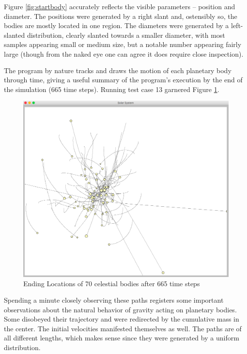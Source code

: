 Figure \ref{fig:startbody} accurately reflects the visible parameters – position and diameter. The positions were generated by a right slant and, ostensibly so, the bodies are mostly located in one region. The diameters were generated by a left-slanted distribution, clearly slanted towards a smaller diameter, with most samples appearing small or medium size, but a notable number appearing fairly large (though from the naked eye one can agree it does require close inspection).

The program by nature tracks and draws the motion of each planetary body through time, giving a useful summary of the program's execution by the end of the simulation (665 time steps). Running test case 13 garnered Figure \ref{fig:endbody}.

\begin{figure}[h!]
\centering
\includegraphics[scale=0.4]{final-ex.png}
\caption{Ending Locations of 70 celestial bodies after 665 time steps}
\label{fig:endbody}
\end{figure}

Spending a minute closely observing these paths registers some important observations about the natural behavior of gravity acting on planetary bodies. Some disobeyed their trajectory and were redirected by the cumulative mass in the center. The initial velocities manifested themselves as well. The paths are of all different lengths, which makes sense since they were generated by a uniform distribution.

